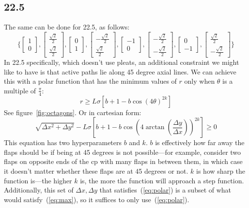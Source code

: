 \documentclass[12pt]{article}
\begin{document}
\subsection{22.5}
The same can be done for 22.5, as follows:
\[
\{
    \begin{bmatrix}1\\0\end{bmatrix},
    \begin{bmatrix}\frac{\sqrt{2}}{2}\\\frac{\sqrt{2}}{2}\end{bmatrix},
    \begin{bmatrix}0\\1\end{bmatrix},
    \begin{bmatrix}-\frac{\sqrt{2}}{2}\\\frac{\sqrt{2}}{2}\end{bmatrix},
    \begin{bmatrix}-1\\0\end{bmatrix},
    \begin{bmatrix}-\frac{\sqrt{2}}{2}\\-\frac{\sqrt{2}}{2}\end{bmatrix},
    \begin{bmatrix}0\\-1\end{bmatrix},
    \begin{bmatrix}\frac{\sqrt{2}}{2}\\-\frac{\sqrt{2}}{2}\end{bmatrix}
\}
\]
In 22.5 specifically, which doesn't use pleats, an additional constraint we might like to have is that active paths lie along 45 degree axial lines. We can achieve this with a polar function that has the minimum values of $r$ only when $\theta$ is a multiple of $\frac{\pi}{4}$:
\[
    r \geq L\sigma \left[b+1-b\cos(4\theta)^{2k}\right]
\]
See figure~\ref{fig:octagons}. Or in cartesian form:
\begin{equation}\label{eq:polar}
    \sqrt{\Delta x^2 + \Delta y^2} - L\sigma \left[b+1-b\cos(4\arctan(\frac{\Delta y}{\Delta x}))^{2k}\right] \geq 0
\end{equation}
This equation has two hyperparameters $b$ and $k$. $b$ is effectively how far away the flaps should be if being at 45 degrees is not possible---for example, consider two flaps on opposite ends of the cp with many flaps in between them, in which case it doesn't matter whether these flaps are at 45 degrees or not. $k$ is how sharp the function is---the higher $k$ is, the more the function will approach a step function. Additionally, this set of $\Delta x, \Delta y$ that satisfies~(\ref{eq:polar}) is a subset of what would satisfy~(\ref{eq:max}), so it suffices to only use~(\ref{eq:polar}).
\end{document}
